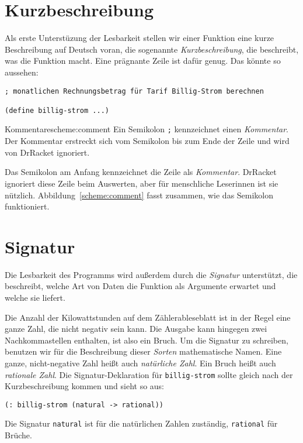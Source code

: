 \section{Kurzbeschreibung}

Als erste Unterstüzung der Lesbarkeit stellen wir einer Funktion eine
kurze Beschreibung auf Deutsch voran, die
sogenannte \textit{Kurzbeschreibung}, die
beschreibt, was die Funktion macht.  Eine prägnante Zeile ist dafür
genug.  Das könnte so aussehen:
%
\begin{lstlisting}
; monatlichen Rechnungsbetrag für Tarif Billig-Strom berechnen

(define billig-strom ...)
\end{lstlisting}
%
\begin{feature}{Kommentare}{scheme:comment}
  Ein Semikolon \lstinline{;} kennzeichnet einen 
  \textit{Kommentar}.  Der Kommentar erstreckt sich
  vom Semikolon bis zum Ende der Zeile und wird von DrRacket
  ignoriert.
\end{feature}
%
Das Semikolon am Anfang kennzeichnet die Zeile als
\textit{Kommentar}. DrRacket ignoriert diese Zeile
beim Auswerten, aber für menschliche Leserinnen ist sie nützlich.
Abbildung~\ref{scheme:comment} fasst zusammen, wie das Semikolon
funktioniert.

\section{Signatur}

Die Lesbarkeit des Programms wird außerdem durch die
\textit{Signatur} unterstützt, die
beschreibt, welche Art von Daten die Funktion als Argumente erwartet und welche sie liefert.

Die Anzahl der Kilowattstunden auf dem Zählerableseblatt ist in der
Regel eine ganze Zahl, die nicht negativ sein kann.  Die Ausgabe kann
hingegen zwei Nachkommastellen enthalten, ist also ein Bruch.  Um die
Signatur zu schreiben, benutzen wir für die Beschreibung dieser
\textit{Sorten} mathematische Namen.  Eine ganze,
nicht-negative Zahl heißt auch \textit{natürliche
  Zahl}.  Ein Bruch heißt auch
\textit{rationale Zahl}.  Die
Signatur-Deklaration für \lstinline{billig-strom} sollte gleich nach der
Kurzbeschreibung kommen und sieht so aus:
%
\begin{lstlisting}
(: billig-strom (natural -> rational))
\end{lstlisting}
%
Die Signatur \lstinline{natural} ist für die natürlichen Zahlen zuständig,
\lstinline{rational} für Brüche.

